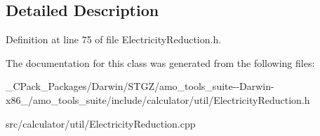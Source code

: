 \subsection{Detailed Description}


Definition at line 75 of file Electricity\+Reduction.\+h.



The documentation for this class was generated from the following files\+:\begin{DoxyCompactItemize}
\item 
\+\_\+\+C\+Pack\+\_\+\+Packages/\+Darwin/\+S\+T\+G\+Z/amo\+\_\+tools\+\_\+suite-\/-\/\+Darwin-\/x86\+\_/amo\+\_\+tools\+\_\+suite/include/calculator/util/Electricity\+Reduction.\+h\item 
src/calculator/util/Electricity\+Reduction.\+cpp\end{DoxyCompactItemize}
